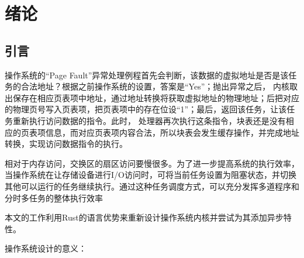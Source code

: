 \chapter{绪论}
\label{chap:references}

\section{引言}

操作系统的“Page Fault”异常处理例程首先会判断，该数据的虚拟地址是否是该任务的合法地址？根据之前操作系统的设置，答案是“Yes”；抛出异常之后， 内核取出保存在相应页表项中地址，通过地址转换将获取虚拟地址的物理地址；后把对应的物理页号写入页表项，把页表项中的存在位设“1”；最后，返回该任务，让该任务重新执行访问数据的指令。此时， 处理器再次执行这条指令，块表还是没有相应的页表项信息，而对应页表项内容合法，所以块表会发生缓存操作，并完成地址转换，实现访问数据指令的执行。

相对于内存访问，交换区的扇区访问要慢很多。为了进一步提高系统的执行效率，当操作系统在让存储设备进行I/O访问时，可将当前任务设置为阻塞状态，并切换其他可以运行的任务继续执行。通过这种任务调度方式，可以充分发挥多道程序和分时多任务的整体执行效率

本文的工作利用Rust的语言优势来重新设计操作系统内核并尝试为其添加异步特性。

操作系统设计的意义：

